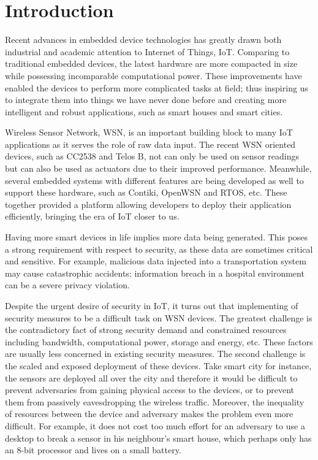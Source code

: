\chapter{Introduction}

Recent advances in embedded device technologies has greatly drawn both industrial and academic attention to Internet of Things, IoT. Comparing to traditional embedded devices, the latest hardware are more compacted in size while possessing incomparable computational power. These improvements have enabled the devices to perform more complicated tasks at field; thus inspiring us to integrate them into things we have never done before and creating more intelligent and robust applications, such as smart houses and smart cities. 

Wireless Sensor Network, WSN, is an important building block to many IoT applications as it serves the role of raw data input. The recent WSN oriented devices, such as CC2538\cite{CC2538} and Telos B\cite{TelosB}, not can only be used on sensor readings but can also be used as actuators due to their improved performance. Meanwhile, several embedded systems with different features are being developed as well to support these hardware, such as Contiki, OpenWSN and RTOS, etc. These together provided a platform allowing developers to deploy their application efficiently, bringing the era of IoT closer to us.
 
Having more smart devices in life implies more data being generated. This poses a strong requirement with respect to security, as these data are sometimes critical and sensitive. For example, malicious data injected into a transportation system may cause catastrophic accidents; information breach in a hospital environment can be a severe privacy violation.

Despite the urgent desire of security in IoT, it turns out that implementing of security measures to be a difficult task on WSN devices. The greatest challenge is the contradictory fact of strong security demand and constrained resources including bandwidth, computational power, storage and energy, etc. These factors are usually less concerned in existing security measures. The second challenge is the scaled and exposed deployment of these devices. Take smart city for instance, the sensors are deployed all over the city and therefore it would be difficult to prevent adversaries from gaining physical access to the devices, or to prevent them from passively eavesdropping the wireless traffic. Moreover, the inequality of resources between the device and adversary makes the problem even more difficult. For example, it does not cost too much effort for an adversary to use a desktop to break a sensor in his neighbour’s smart house, which perhaps only has an 8-bit processor and lives on a small battery.

